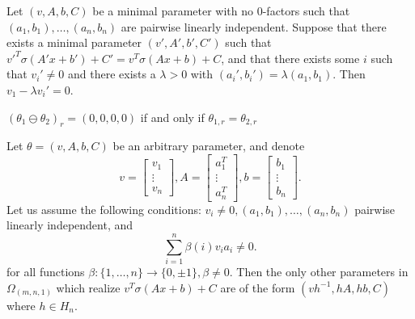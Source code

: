 \documentclass[10pt,a4paper]{amsart}
\begin{document}
\begin{corollary}\label{cor:semidependenttermscancelling}
    Let $(v, A, b, C)$ be a minimal parameter with no 0-factors such that $(a_1, b_1), \ldots, (a_n, b_n)$ are pairwise linearly independent. Suppose that there exists a minimal parameter $(v', A', b', C')$ such that $v'^T\sigma (A' x + b')+C' = v^T\sigma (Ax + b) + C$, and that there exists some $i$ such that $v_i'\neq 0$ and there exists a $\lambda>0$ with $(a_i', b_i')=\lambda (a_1, b_1)$. Then $v_1-\lambda v_i'=0$. 
\end{corollary}

\begin{lemma}\label{lem:0Hnrelation}
    $(\theta_1\ominus \theta_2)_r = (0, 0, 0, 0)$ if and only if $\theta_{1, r}=\theta_{2, r}$ 
\end{lemma}

\begin{proposition}\label{prop:mn1genericity}
    Let $\theta=(v, A, b, C)$ be an arbitrary parameter, and denote
    $$
    v = \begin{bmatrix}
        v_1 \\ \vdots\\ v_n
    \end{bmatrix}, A = \begin{bmatrix}
        a_1^T\\ \vdots\\ a_n^T
    \end{bmatrix}, b = \begin{bmatrix}
        b_1 \\ \vdots\\ b_n
    \end{bmatrix}.
    $$
    Let us assume the following conditions: $v_i\neq 0, (a_1, b_1), \ldots, (a_n, b_n)$ pairwise linearly independent, and 
    $$
    \sum_{i=1}^n \beta(i)v_ia_i\neq 0.
    $$
    for all functions $\beta: \{1, \ldots, n\}\rightarrow \{0,  \pm1\}, \beta\neq 0$. Then the only other parameters in $\Omega_{(m,n,1)}$ which realize $v^T\sigma(Ax+b)+C$ are of the form $(vh^{-1}, hA, hb, C)$ where $h\in H_n$.
\end{proposition}
\end{document}
